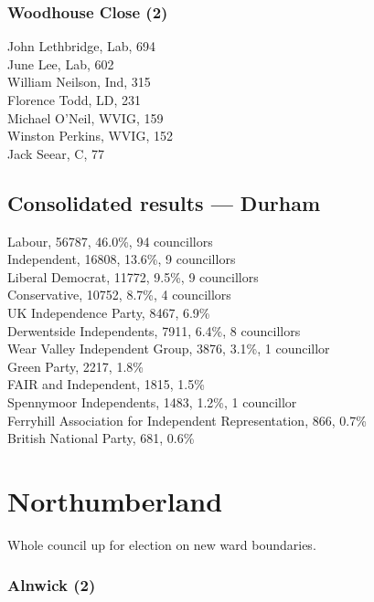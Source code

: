 \documentclass[a4paper,openany,10pt]{book}
\begin{document}
\subsubsection*{Woodhouse Close (2)}



John Lethbridge, Lab, 694\\
June Lee, Lab, 602\\
William Neilson, Ind, 315\\
Florence Todd, LD, 231\\
Michael O'Neil, WVIG, 159\\
Winston Perkins, WVIG, 152\\
Jack Seear, C, 77\\




\subsection*{Consolidated results --- Durham}
Labour, 56787, 46.0\%, 94 councillors\\
Independent, 16808, 13.6\%, 9 councillors\\
Liberal Democrat, 11772, 9.5\%, 9 councillors\\
Conservative, 10752, 8.7\%, 4 councillors\\
UK Independence Party, 8467, 6.9\% \\
Derwentside Independents, 7911, 6.4\%, 8 councillors\\
Wear Valley Independent Group, 3876, 3.1\%, 1 councillor\\
Green Party, 2217, 1.8\% \\
FAIR and Independent, 1815, 1.5\% \\
Spennymoor Independents, 1483, 1.2\%, 1 councillor\\
Ferryhill Association for Independent Representation, 866, 0.7\% \\
British National Party, 681, 0.6\% \\


\section{Northumberland}

Whole council up for election on new ward boundaries.



\subsubsection*{Alnwick (2)}
\end{document}
